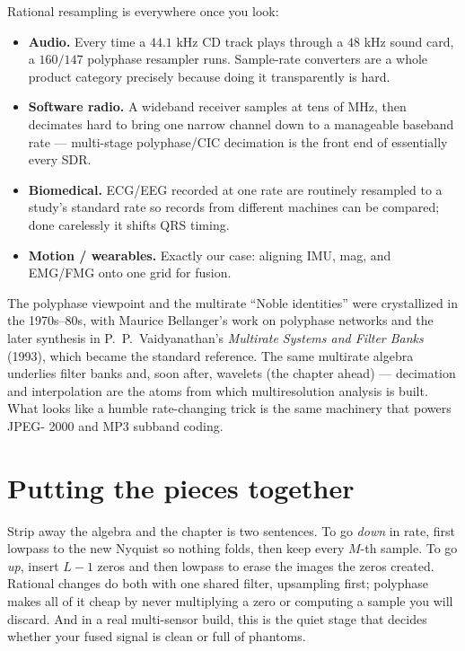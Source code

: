 \begin{applicationbox}
Rational resampling is everywhere once you look:
\begin{itemize}
  \item \textbf{Audio.} Every time a $44.1$ kHz CD track plays through a $48$ kHz
  sound card, a $160/147$ polyphase resampler runs. Sample-rate converters are a
  whole product category precisely because doing it transparently is hard.
  \item \textbf{Software radio.} A wideband receiver samples at tens of MHz, then
  decimates hard to bring one narrow channel down to a manageable baseband rate
  --- multi-stage polyphase/CIC decimation is the front end of essentially every
  SDR.
  \item \textbf{Biomedical.} ECG/EEG recorded at one rate are routinely resampled
  to a study's standard rate so records from different machines can be compared;
  done carelessly it shifts QRS timing.
  \item \textbf{Motion / wearables.} Exactly our case: aligning IMU, mag, and
  EMG/FMG onto one grid for fusion.
\end{itemize}
\end{applicationbox}

\begin{historybox}
The polyphase viewpoint and the multirate ``Noble identities'' were crystallized
in the 1970s--80s, with Maurice Bellanger's work on polyphase networks and the
later synthesis in P.~P.~Vaidyanathan's \emph{Multirate Systems and Filter Banks}
(1993), which became the standard reference. The same multirate algebra underlies
filter banks and, soon after, wavelets (the chapter ahead) --- decimation and
interpolation are the atoms from which multiresolution analysis is built. What
looks like a humble rate-changing trick is the same machinery that powers JPEG-
2000 and MP3 subband coding.
\end{historybox}

\section{Putting the pieces together}
\label{ch22:summary}

Strip away the algebra and the chapter is two sentences. To go \emph{down} in
rate, first lowpass to the new Nyquist so nothing folds, then keep every $M$-th
sample. To go \emph{up}, insert $L-1$ zeros and then lowpass to erase the images
the zeros created. Rational changes do both with one shared filter, upsampling
first; polyphase makes all of it cheap by never multiplying a zero or computing a
sample you will discard. And in a real multi-sensor build, this is the quiet
stage that decides whether your fused signal is clean or full of phantoms.

